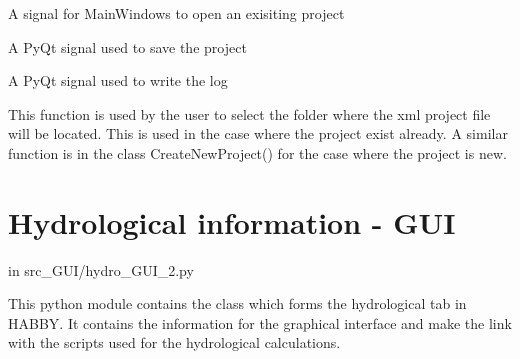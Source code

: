 \documentclass[letterpaper,10pt,english]{sphinxmanual}
\begin{document}
\begin{fulllineitems}
\begin{fulllineitems}
\label{\detokenize{index:src_GUI.Main_windows_1.WelcomeW.open_proj}}
A signal for MainWindows to open an exisiting project

\end{fulllineitems}


\begin{fulllineitems}
\label{\detokenize{index:src_GUI.Main_windows_1.WelcomeW.save_signal}}
A PyQt signal used to save the project

\end{fulllineitems}


\begin{fulllineitems}
\label{\detokenize{index:src_GUI.Main_windows_1.WelcomeW.send_log}}
A PyQt signal used to write the log

\end{fulllineitems}


\begin{fulllineitems}
\label{\detokenize{index:src_GUI.Main_windows_1.WelcomeW.setfolder}}
This function is used by the user to select the folder where the xml project file will be located.
This is used in the case where the project exist already. A similar function is in the class CreateNewProject()
for the case where the project is new.

\end{fulllineitems}


\end{fulllineitems}



\section{Hydrological information - GUI}
\label{\detokenize{index:hydrological-information-gui}}
in src\_GUI/hydro\_GUI\_2.py

This python module contains the class which forms the hydrological tab in HABBY.
It contains the information for the graphical interface and make the link with the scripts
used for the hydrological calculations.
\label{\detokenize{index:module-src_GUI.hydro_GUI_2}}
\end{document}
